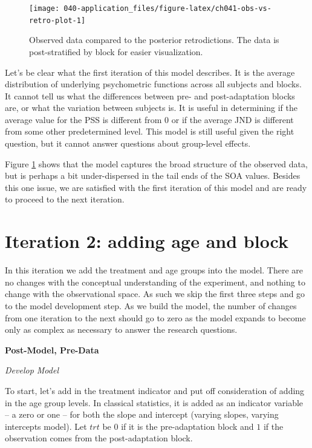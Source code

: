 \documentclass[11pt, oneside, openany]{scrbook}
\begin{document}

\begin{figure}

{\centering \texttt{[image: 040-application\_files/figure-latex/ch041-obs-vs-retro-plot-1]} 

}

\caption{Observed data compared to the posterior retrodictions. The data is post-stratified by block for easier visualization.}\label{fig:ch041-obs-vs-retro-plot}
\end{figure}

Let's be clear what the first iteration of this model describes. It is the average distribution of underlying psychometric functions across all subjects and blocks. It cannot tell us what the differences between pre- and post-adaptation blocks are, or what the variation between subjects is. It is useful in determining if the average value for the PSS is different from 0 or if the average JND is different from some other predetermined level. This model is still useful given the right question, but it cannot answer questions about group-level effects.

Figure \ref{fig:ch041-obs-vs-retro-plot} shows that the model captures the broad structure of the observed data, but is perhaps a bit under-dispersed in the tail ends of the SOA values. Besides this one issue, we are satisfied with the first iteration of this model and are ready to proceed to the next iteration.

\hypertarget{iter2}{%
\section{Iteration 2: adding age and block}\label{iter2}}

In this iteration we add the treatment and age groups into the model. There are no changes with the conceptual understanding of the experiment, and nothing to change with the observational space. As such we skip the first three steps and go to the model development step. As we build the model, the number of changes from one iteration to the next should go to zero as the model expands to become only as complex as necessary to answer the research questions.

\textbf{Post-Model, Pre-Data}

\emph{Develop Model}

To start, let's add in the treatment indicator and put off consideration of adding in the age group levels. In classical statistics, it is added as an indicator variable -- a zero or one -- for both the slope and intercept (varying slopes, varying intercepts model). Let \(trt\) be \(0\) if it is the pre-adaptation block and \(1\) if the observation comes from the post-adaptation block.
\end{document}

